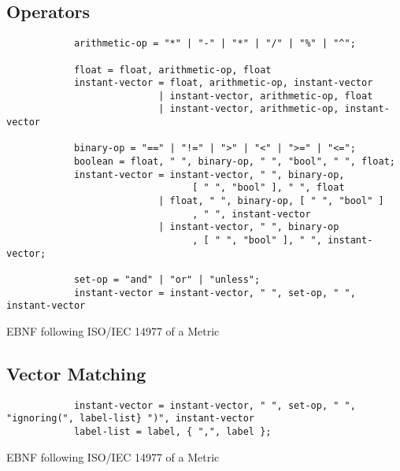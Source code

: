 %
%	

\subsection{Operators}

\begin{listing}[H]
	\begin{samepage}
		\begin{verbatim}
			arithmetic-op = "*" | "-" | "*" | "/" | "%" | "^";
			
			float = float, arithmetic-op, float
			instant-vector = float, arithmetic-op, instant-vector
			               | instant-vector, arithmetic-op, float
			               | instant-vector, arithmetic-op, instant-vector
			
			binary-op = "==" | "!=" | ">" | "<" | ">=" | "<=";
			boolean = float, " ", binary-op, " ", "bool", " ", float;
			instant-vector = instant-vector, " ", binary-op, 
			                     [ " ", "bool" ], " ", float
			               | float, " ", binary-op, [ " ", "bool" ]
			                     , " ", instant-vector
			               | instant-vector, " ", binary-op
			                     , [ " ", "bool" ], " ", instant-vector;
			
			set-op = "and" | "or" | "unless";
			instant-vector = instant-vector, " ", set-op, " ", instant-vector
		\end{verbatim}
		\caption{EBNF following ISO/IEC 14977 of a Metric}
	\end{samepage}
\end{listing}


\subsection{Vector Matching}

\begin{listing}[H]
	\begin{samepage}
		\begin{verbatim}
			instant-vector = instant-vector, " ", set-op, " ", "ignoring(", label-list} ")", instant-vector
			label-list = label, { ",", label };
		\end{verbatim}
		\caption{EBNF following ISO/IEC 14977 of a Metric}
	\end{samepage}
\end{listing}


